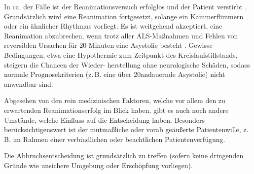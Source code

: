 \Text
{}%
{%
In ca. \PC* der Fälle ist der
Reanimationsversuch erfolglos und der Patient verstirbt
\cite{StriebelAnaesthesie2-Band2,Erc2005DeSec8}.
Grundsätzlich wird eine Reanimation fortgesetzt, solange ein
Kammerflimmern oder ein ähnlicher Rhythmus vorliegt. Es ist
weitgehend akzeptiert, eine Reanimation abzubrechen, wenn
trotz aller ALS-Maßnahmen und Fehlen von reversiblen
Ursachen für 20 Minuten eine Asystolie besteht
\cite{Erc2010Sec10,Bonnin1993,StriebelAnaesthesie2-Band2}.
Gewisse Bedingungen, etwa eine Hypothermie zum Zeitpunkt
des Kreislaufstillstands, steigern die Chancen der Wieder-
herstellung ohne neurologische Schäden,
sodass normale Prognosekriterien (z.\,B.
eine über 20\Min* andauernde Asystolie)
nicht anwendbar sind. \autocite{Erc2005DeSec8}

Abgesehen von den rein medizinischen Faktoren,
welche vor allem den zu erwartenden Reanimationserfolg im
Blick haben, gibt es auch noch andere Umstände, welche
Einfluss auf die Entscheidung haben. Besonders
berücksichtigenswert ist der mutmaßliche oder vorab
geäußerte Patientenwille, z.\,B. im Rahmen einer
verbindlichen oder beachtlichen Patientenverfügung.

Die Abbruchsentscheidung ist grundsätzlich  zu treffen (sofern keine dringenden Gründe wie
unsichere Umgebung oder Erschöpfung vorliegen).
}%


